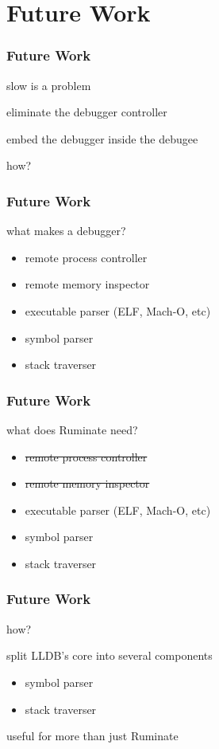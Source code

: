 \documentclass{beamer}
\begin{document}
\section{Future Work}

\begin{frame}
	\frametitle{Future Work}

	slow is a problem

	\pause

	eliminate the debugger controller

	\pause

	embed the debugger inside the debugee

	\pause

	how?
\end{frame}

\begin{frame}
	\frametitle{Future Work}

	what makes a debugger?

	\pause

	\begin{itemize}
		\item remote process controller
		\item remote memory inspector
		\item executable parser (ELF, Mach-O, etc)
		\item symbol parser
		\item stack traverser
	\end{itemize}
\end{frame}

\begin{frame}
	\frametitle{Future Work}

	what does Ruminate need?

	\pause

	\begin{itemize}
		\item \sout{remote process controller}
		\item \sout{remote memory inspector}
		\item executable parser (ELF, Mach-O, etc)
		\item symbol parser
		\item stack traverser
	\end{itemize}
\end{frame}

\begin{frame}
	\frametitle{Future Work}

	how?

	\pause

	split LLDB's core into several components
	\begin{itemize}
		\item symbol parser
		\item stack traverser
	\end{itemize}
	useful for more than just Ruminate
\end{frame}
\end{document}
